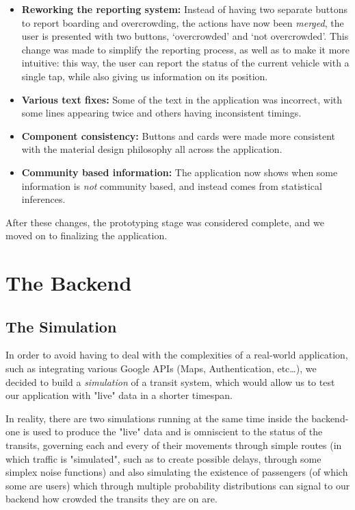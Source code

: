 \documentclass[a4paper, 11pt]{report}
\begin{document}
\begin{itemize}
	\item \textbf{Reworking the reporting system:} Instead of having two separate
	      buttons to report boarding and overcrowding, the actions have now been \emph{merged}, the user is presented with two buttons, `overcrowded' and `not overcrowded'. This change was made to simplify the reporting process, as well as to make it more intuitive: this way, the user can report the status of the current vehicle with a single tap, while also giving us information on its position.
	\item \textbf{Various text fixes:} Some of the text in the application was
	      incorrect, with some lines appearing twice and others having inconsistent
	      timings.
	\item \textbf{Component consistency:} Buttons and cards were made more consistent with
	      the material design philosophy all across the application.
	\item \textbf{Community based information:} The application now shows when
	      some information is \emph{not} community based, and instead comes from
	      statistical inferences.
\end{itemize}

After these changes, the prototyping stage was considered complete, and we
moved on to finalizing the application.

\section{The Backend}\label{sec:the-backend}

\subsection{The Simulation}\label{ssec:the-simulation}

In order to avoid having to deal with the complexities of a real-world application,
such as integrating various Google APIs (Maps, Authentication, etc\dots), we decided to build a \emph{simulation} of a transit system, which would allow us to test our application with "live" data in a shorter timespan.

In reality, there are two simulations running at the same time inside the backend- one is used to produce the "live" data and is omniscient to the status of the transits, governing each and every of their movements through simple routes (in which traffic is "simulated", such as to create possible delays, through some simplex noise functions) and also simulating the existence of passengers (of which some are users) which through multiple probability distributions can signal to our backend how crowded the transits they are on are.
\end{document}
